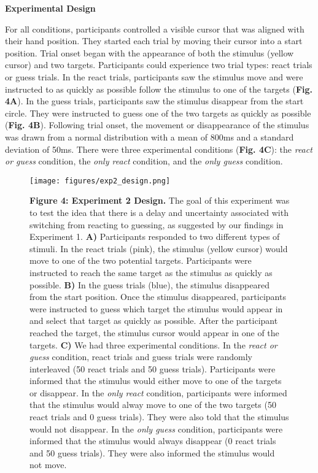 \documentclass[12pt]{article}
\newcommand\boldblue[1]{\textcolor{mydarkblue}{\textbf{#1}}}
\begin{document}
\noindent \boldblue{Experimental Design}

\noindent For all conditions, participants controlled a visible cursor that was aligned with their hand position. They started each trial by moving their cursor into a start position. Trial onset began with the appearance of both the stimulus (yellow cursor) and two targets. Participants could experience two trial types: react trials or guess trials. In the react trials, participants saw the stimulus move and were instructed to as quickly as possible follow the stimulus to one of the targets (\boldblue{Fig. 4A}). In the guess trials, participants saw the stimulus disappear from the start circle. They were instructed to guess one of the two targets as quickly as possible (\boldblue{Fig. 4B}). Following trial onset, the movement or disappearance of the stimulus was drawn from a normal distribution with a mean of 800ms and a standard deviation of 50ms. There were three experimental conditions (\boldblue{Fig. 4C}): the \emph{react or guess} condition, the \emph{only react} condition, and the \emph{only guess} condition. 

\begin{figure}[H]
  \centering
  \texttt{[image: figures/exp2\_design.png]}

  \caption*{\boldblue{Figure 4: Experiment 2 Design.} The goal of this experiment was to test the idea that there is a delay and uncertainty associated with switching from reacting to guessing, as suggested by our findings in  Experiment 1. \boldblue{A)} Participants responded to two different types of stimuli. In the react trials (pink), the stimulus (yellow cursor) would move to one of the two potential targets. Participants were instructed to reach the same target as the stimulus as quickly as possible. \boldblue{B)} In the guess trials (blue), the stimulus disappeared from the start position. Once the stimulus disappeared, participants were instructed to guess which target the stimulus would appear in and select that target as quickly as possible. After the participant reached the target, the stimulus cursor would appear in one of the targets. \boldblue{C)} We had three experimental conditions. In the \emph{react or guess} condition, react trials and guess trials were randomly interleaved (50 react trials and 50 guess trials). Participants were informed that the stimulus would either move to one of the targets or disappear. In the \emph{only react} condition, participants were informed that the stimulus would alway move to one of the two targets (50 react trials and 0 guess trials). They were also told that the stimulus would not disappear. In the \emph{only guess} condition, participants were informed that the stimulus would always disappear (0 react trials and 50 guess trials). They were also informed the stimulus would not move. }
\end{figure}
\end{document}
